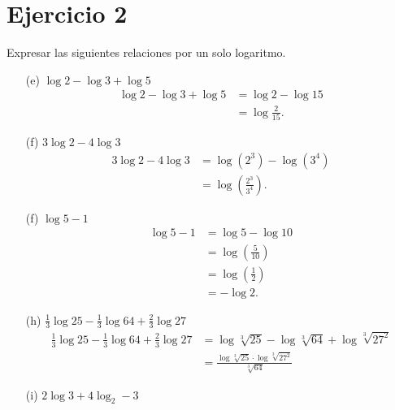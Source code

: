 \documentclass{article}
\begin{document}
\section*{Ejercicio 2}
Expresar las siguientes relaciones por un solo logaritmo.
\begin{itemize}
    \item[(e)] \( \log 2 - \log 3 + \log 5 \)
        \begin{align*}
            \log 2 - \log 3 + \log 5 &= \log 2 - \log 15 \\
            &= \log \frac{2}{15} 
        .\end{align*}
    \item[(f)] \( 3 \log 2 - 4 \log 3 \)
        \begin{align*}
            3 \log 2 - 4 \log 3 &= \log( 2^3) - \log(3 ^4) \\
                                &= \log \left( \frac{2^3}{3^4} \right)  
        .\end{align*}
    \item[(f)] \( \log 5 - 1 \)
        \begin{align*}
            \log 5 - 1 &= \log 5 - \log 10 \\
            &= \log \left( \frac{5}{10} \right)  \\
            &= \log \left( \frac{1}{2} \right)  \\
            &= -\log 2
        .\end{align*}
    \item[(h)] \( \frac{1}{3}\log 25 - \frac{1}{3}\log 64 + \frac{2 }{3}\log 27 \) 
        \begin{align*}
            \frac{1}{3}\log 25 - \frac{1}{3}\log 64 + \frac{2 }{3}\log 27 &=\log \sqrt[3]{25}  - \log \sqrt[3]{64}+\log \sqrt[3]{27^2}   \\
                                                                          &=\frac{ \log \sqrt[3]{25} \cdot \log \sqrt[3]{27^2} }{\sqrt[3]{64}}
        \end{align*}
    \item[(i)] \( 2 \log 3 + 4 \log_2 - 3 \)
\end{itemize}
\end{document}
